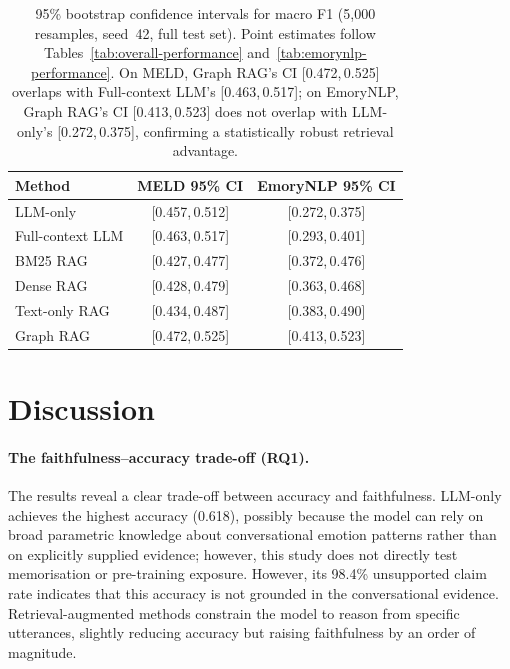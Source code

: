 \documentclass[runningheads]{llncs}
\begin{document}
\begin{table}[t]
\centering
\caption{95\% bootstrap confidence intervals for macro F1 (5{,}000 resamples,
seed~42, full test set). Point estimates follow Tables~\ref{tab:overall-performance}
and~\ref{tab:emorynlp-performance}. On MELD, Graph RAG's CI [0.472,\,0.525]
overlaps with Full-context LLM's [0.463,\,0.517]; on EmoryNLP, Graph RAG's
CI [0.413,\,0.523] does not overlap with LLM-only's [0.272,\,0.375],
confirming a statistically robust retrieval advantage.}
\label{tab:bootstrap-ci}
\begin{tabular}{lcc}
\toprule
Method & MELD 95\% CI & EmoryNLP 95\% CI \\
\midrule
LLM-only          & [0.457,\,0.512] & [0.272,\,0.375] \\
Full-context LLM  & [0.463,\,0.517] & [0.293,\,0.401] \\
BM25 RAG          & [0.427,\,0.477] & [0.372,\,0.476] \\
Dense RAG         & [0.428,\,0.479] & [0.363,\,0.468] \\
Text-only RAG     & [0.434,\,0.487] & [0.383,\,0.490] \\
Graph RAG         & [0.472,\,0.525] & [0.413,\,0.523] \\
\bottomrule
\end{tabular}
\end{table}

\section{Discussion}
\label{sec:discussion}

\paragraph{The faithfulness--accuracy trade-off (RQ1).}
The results reveal a clear trade-off between accuracy and faithfulness.
LLM-only achieves the highest accuracy (0.618), possibly because the
model can rely on broad parametric knowledge about conversational emotion
patterns rather than on explicitly supplied evidence; however, this
study does not directly test memorisation or pre-training exposure.
However, its 98.4\% unsupported claim rate indicates that this accuracy
is not grounded in the conversational evidence. Retrieval-augmented
methods constrain the model to reason from specific utterances,
slightly reducing accuracy but raising faithfulness by an order of
magnitude.
\end{document}
